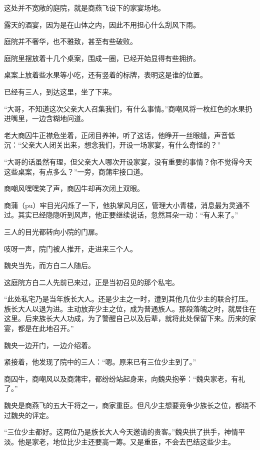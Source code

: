 
\begin{this_body}



这处并不宽敞的庭院，就是商燕飞设下的家宴场地。

露天的酒宴，因为是在山体之内，因此不用担心什么刮风下雨。

庭院并不奢华，也不雅致，甚至有些破败。

庭院里摆放着十几个桌案，围成一圈，已经开始显得有些拥挤。

桌案上放着些水果等小吃，还有竖着的标牌，表明这是谁的位置。

已经有三人，到达这里，坐了下来。

“大哥，不知道这次父亲大人召集我们，有什么事情。”商嘲风将一枚红色的水果扔进嘴里，一边含糊地问道。

老大商囚牛正襟危坐着，正闭目养神，听了这话，他睁开一丝眼缝，声音低沉：“父亲大人闭关出来，想念我们，开设一场家宴，有什么奇怪的？”

“大哥的话虽然有理，但父亲大人哪次开设家宴，没有重要的事情？你不觉得今天这些桌案，有点多么？”一旁，商蒲牢接口道。

商嘲风嘿嘿笑了声，商囚牛却再次闭上双眼。

商蒲（pu）牢目光闪烁了一下，他执掌风月区，管理大小青楼，消息最为灵通不过。其实已经隐隐听到风声，他正要继续说话，忽然耳朵一动：“有人来了。”

三人的目光都转向小院的门扉。

吱呀一声，院门被人推开，走进来三个人。

魏央当先，而方白二人随后。

这庭院方白二人先前已来过，正是当初召见的那个私宅。

“此处私宅乃是当年族长大人。还是少主之一时，遭到其他几位少主的联合打压。族长大人以退为进。主动放弃少主之位，成为普通族人。那段落魄之时，就居住在这里。后来族长大人功成，为了警醒自己以及后辈，就将此处保留下来。历来的家宴，都是在此地召开。”

魏央一边开门，一边介绍着。

紧接着，他发现了院中的三人：“嗯。原来已有三位少主到了。”

商囚牛，商嘲风以及商蒲牢，都纷纷站起身来，向魏央抱拳：“魏央家老，有礼了。”

魏央是商燕飞的五大干将之一，商家重臣。但凡少主想要竞争少族长之位，都绕不过魏央的评定。

“三位少主都好。这两位乃是族长大人今天邀请的贵客。”魏央拱了拱手，神情平淡。他是家老，地位比少主还要高一筹。又是重臣，不会去巴结这些少主。


\end{this_body}
